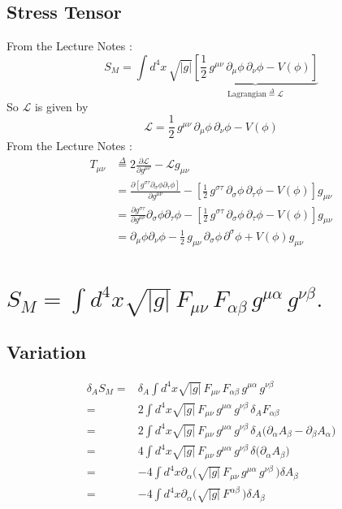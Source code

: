\documentclass[]{article}
\newcommand{\Lagr}{\mathscr{L}}
\begin{document}
\subsection{Stress Tensor} \label{subseq:StressTensor}
From the Lecture Notes \cite[Lecture III, Section 3]{akhmedev2016}:
\begin{equation}
S_M = \int d^4x \, \sqrt{|g|} \underbrace{\left[\frac12 \, g^{\mu\nu} \, \partial_\mu \phi \, \partial_\nu \phi - V(\phi)\right]}_{\text{Lagrangian}\overset{\Delta}{=}\Lagr}
\end{equation}
So $\Lagr$ is given by
\begin{equation}
\Lagr=\frac12 \, g^{\mu\nu} \, \partial_\mu \phi \, \partial_\nu \phi - V(\phi)
\end{equation}
From the Lecture Notes \cite[(64)]{akhmedev2016}:
\begin{align}
T_{\mu\nu}&\overset{\Delta}{=}2 \frac{\partial \Lagr}{\partial g^{\mu\nu}} - \Lagr g_{\mu\nu} \nonumber \\
&=\frac{\partial [g^{\sigma\tau}\partial_\sigma \phi \partial_\tau \phi]}{\partial g^{\mu\nu}}-[\frac12 \, g^{\sigma\tau} \, \partial_\sigma \phi \, \partial_\tau \phi - V(\phi)] g_{\mu\nu} \nonumber \\
&=\frac{\partial g^{\sigma\tau}}{\partial g^{\mu\nu}}\partial_\sigma \phi \partial_\tau \phi-[\frac12 \, g^{\sigma\tau} \, \partial_\sigma \phi \, \partial_\tau \phi - V(\phi)] g_{\mu\nu} \nonumber \\
&=\partial_\mu \phi \partial_\nu \phi - \frac12 \, g_{\mu\nu} \, \partial_\sigma \phi \, \partial^\sigma \phi  + V(\phi) g_{\mu\nu} 
\end{align}

\section{$S_M = \int d^4x \sqrt{|g|} \, F_{\mu\nu}\, F_{\alpha\beta} \, g^{\mu\alpha} \, g^{\nu\beta}.$}
\subsection{Variation}
\begin{align*}
\delta_A S_M =& \delta_A \int d^4x \sqrt{|g|} \, F_{\mu\nu}\, F_{\alpha\beta} \, g^{\mu\alpha} \, g^{\nu\beta} \\
=& 2 \int d^4x \sqrt{|g|} \, F_{\mu\nu} \, g^{\mu\alpha} \, g^{\nu\beta} \, \delta_A F_{\alpha\beta}\\
=& 2 \int d^4x \sqrt{|g|} \, F_{\mu\nu} \, g^{\mu\alpha} \, g^{\nu\beta} \, \delta_A \big(\partial_\alpha A_\beta - \partial_\beta A_\alpha\big)\\
=& 4 \int d^4x \sqrt{|g|} \, F_{\mu\nu} \, g^{\mu\alpha} \, g^{\nu\beta} \, \delta \big(\partial_\alpha A_\beta \big)\\
=& -4 \int d^4x \partial_\alpha \big(\sqrt{|g|} \, F_{\mu\nu} \, g^{\mu\alpha} \, g^{\nu\beta} \,\big) \delta A_\beta\\
=& -4 \int d^4x \partial_\alpha \big(\sqrt{|g|} \, F^{\alpha\beta}  \,\big) \delta A_\beta
\end{align*}
\end{document}

